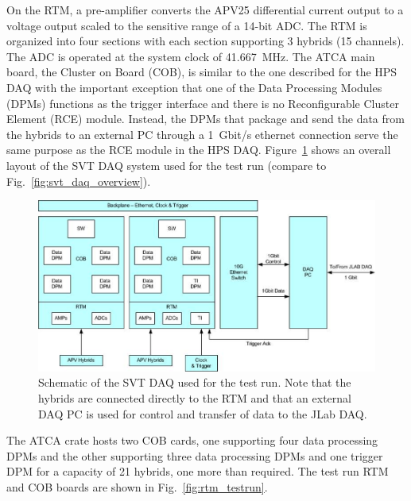 On the RTM, a pre-amplifier converts the APV25 differential current output to a voltage output 
scaled to the sensitive range of a 14-bit ADC. The RTM is organized into four sections with each section 
supporting 3 hybrids (15 channels). The ADC is operated at the system clock of 41.667~MHz. 
The ATCA main board, the Cluster on Board (COB), is similar to the one described for the HPS DAQ 
with the important exception that one of the Data Processing Modules (DPMs) functions as the trigger 
interface and there is no Reconfigurable Cluster Element (RCE) module. Instead, the DPMs that package and send the data from the hybrids to 
an external PC through a 1~Gbit/s ethernet connection serve the same purpose as the 
RCE module in the HPS DAQ. Figure~\ref{fig:svtdaq} shows an overall layout of 
the SVT DAQ system used for the test run (compare to Fig.~\ref{fig:svt_daq_overview}).
 \begin{figure}[t]
\includegraphics[scale=0.9]{test2012/daq/svt_daq_diagram.png}
\caption{\small{Schematic of the SVT DAQ used for the test run. Note that the hybrids are connected directly 
to the RTM and that an external DAQ PC is used for control and transfer of data to the JLab DAQ.}}
\label{fig:svtdaq}
\end{figure}
The ATCA crate hosts two COB cards, one supporting four data processing DPMs and the other supporting three data processing DPMs and one trigger DPM for a capacity of 21 hybrids, one more than required. 
The test run RTM and COB boards are shown in Fig.~\ref{fig:rtm_testrun}. 
